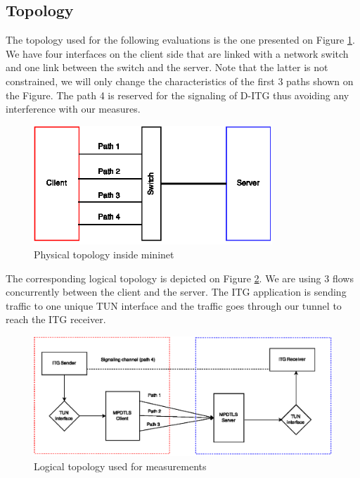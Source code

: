 \subsection{Topology}

The topology used for the following evaluations is the one presented on Figure \ref{fig:topo-phys}. We have four interfaces on the client side that are linked with a network switch and one link between the switch and the server. Note that the latter is not constrained, we will only change the characteristics of the first 3 paths shown on the Figure. The path 4 is reserved for the signaling of D-ITG thus avoiding any interference with our measures.


\begin{figure}[!ht]
\centering
\includegraphics[width=0.8\textwidth]{images/perf-topo-phys.eps}
\caption{Physical topology inside mininet}
\label{fig:topo-phys}
\end{figure}

The corresponding logical topology is depicted on Figure \ref{fig:topo-log}. We are using 3 flows concurrently between the client and the server. The ITG application is sending traffic to one unique TUN interface and the traffic goes through our tunnel to reach the ITG receiver.

\begin{figure}[!ht]
\centering
\includegraphics[width=\textwidth]{images/perf-topo-logic.eps}
\caption{Logical topology used for measurements}
\label{fig:topo-log}
\end{figure}

